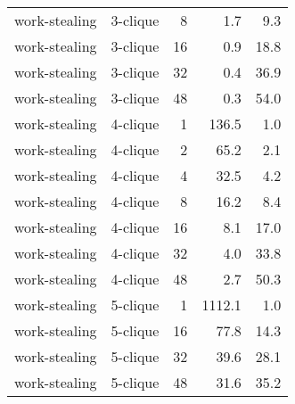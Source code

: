 \begin{longtable}{llr|rr}
 work-stealing &  3-clique &            8 &     1.7 &      9.3 \\
 work-stealing &  3-clique &           16 &     0.9 &     18.8 \\
 work-stealing &  3-clique &           32 &     0.4 &     36.9 \\
 work-stealing &  3-clique &           48 &     0.3 &     54.0 \\
 work-stealing &  4-clique &            1 &   136.5 &      1.0 \\
 work-stealing &  4-clique &            2 &    65.2 &      2.1 \\
 work-stealing &  4-clique &            4 &    32.5 &      4.2 \\
 work-stealing &  4-clique &            8 &    16.2 &      8.4 \\
 work-stealing &  4-clique &           16 &     8.1 &     17.0 \\
 work-stealing &  4-clique &           32 &     4.0 &     33.8 \\
 work-stealing &  4-clique &           48 &     2.7 &     50.3 \\
 work-stealing &  5-clique &            1 &  1112.1 &      1.0 \\
 work-stealing &  5-clique &           16 &    77.8 &     14.3 \\
 work-stealing &  5-clique &           32 &    39.6 &     28.1 \\
 work-stealing &  5-clique &           48 &    31.6 &     35.2 \\
\end{longtable}
